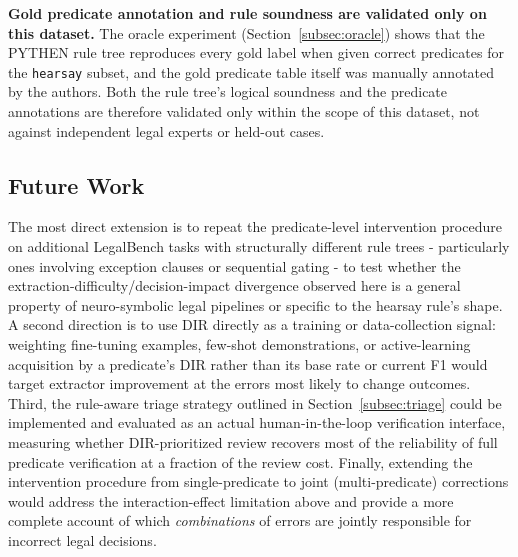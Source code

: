 \textbf{Gold predicate annotation and rule soundness are validated only on this dataset.} The oracle experiment (Section~\ref{subsec:oracle}) shows that the PYTHEN rule tree reproduces every gold label when given correct predicates for the \texttt{hearsay} subset, and the gold predicate table itself was manually annotated by the authors. Both the rule tree's logical soundness and the predicate annotations are therefore validated only within the scope of this dataset, not against independent legal experts or held-out cases.

\subsection{Future Work}
\label{subsec:future-work}
The most direct extension is to repeat the predicate-level intervention procedure on additional LegalBench tasks with structurally different rule trees - particularly ones involving exception clauses or sequential gating - to test whether the extraction-difficulty/decision-impact divergence observed here is a general property of neuro-symbolic legal pipelines or specific to the hearsay rule's shape. A second direction is to use DIR directly as a training or data-collection signal: weighting fine-tuning examples, few-shot demonstrations, or active-learning acquisition by a predicate's DIR rather than its base rate or current F1 would target extractor improvement at the errors most likely to change outcomes. Third, the rule-aware triage strategy outlined in Section~\ref{subsec:triage} could be implemented and evaluated as an actual human-in-the-loop verification interface, measuring whether DIR-prioritized review recovers most of the reliability of full predicate verification at a fraction of the review cost. Finally, extending the intervention procedure from single-predicate to joint (multi-predicate) corrections would address the interaction-effect limitation above and provide a more complete account of which \emph{combinations} of errors are jointly responsible for incorrect legal decisions.
